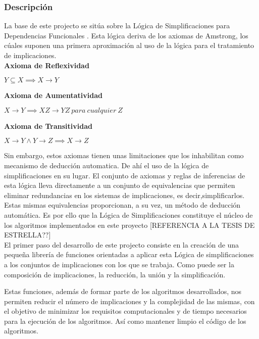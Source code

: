 \subsubsection{Descripci\'on} 

La base de este projecto se sit\'ua sobre la L\'ogica de Simplificaciones para Dependencias Funcionales \cite{Cordero2002}. Esta l\'ogica deriva de los axiomas de Amstrong, los c\'uales suponen una primera aproximaci\'on al uso de la l\'ogica para el tratamiento de implicaciones.\\

\textbf{Axioma de Reflexividad}

\begin{center}
    \(Y \subseteq X \implies X \to Y \)
\end{center}

\textbf{Axioma de Aumentatividad}

\begin{center}
    \(X \to Y \implies XZ \to YZ \ para \ cualquier \ Z \)
\end{center}

\textbf{Axioma de Transitividad}

\begin{center}
    \(X \to Y \wedge Y \to Z \implies X \to Z \)
\end{center}

Sin embargo, estos axiomas tienen unas limitaciones que los inhabilitan como mecanismo de deducci\'on automatica. De ah\'i el uso de la l\'ogica de simplificaciones en su lugar. El conjunto de axiomas y reglas de inferencias de esta l\'ogica lleva directamente a un conjunto de equivalencias que permiten eliminar redundancias en los sistemas de implicaciones, es decir,simplificarlos. Estas mismas equivalencias proporcionan, a su vez, un m\'etodo de deducci\'on autom\'atica. Es por ello que la L\'ogica de Simplificaciones constituye el n\'ucleo de los algoritmos implementados en este proyecto [REFERENCIA A LA TESIS DE ESTRELLA??]\\




El primer paso del desarrollo de este projecto consiste en la creaci\'on de una peque\~na librer\'ia de funciones
orientadas a aplicar esta L\'ogica de simplificaciones a los conjuntos de implicaciones con los que se trabaja. Como 
puede ser la composici\'on de implicaciones, la reducci\'on, la uni\'on y la simplificaci\'on.

Estas funciones, adem\'as de formar parte de los algoritmos desarrollados, nos permiten reducir el n\'umero de 
implicaciones y la complejidad de las mismas, con el objetivo de minimizar los requisitos computacionales y de tiempo
necesarios para la ejecuci\'on de los algoritmos. As\'i como mantener limpio el c\'odigo de los algoritmos.


